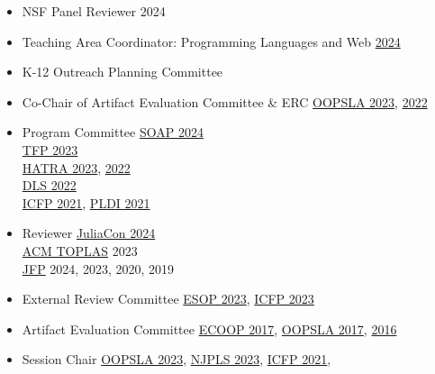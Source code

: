 \documentclass[11pt]{article}
\begin{document}
\begin{itemize}
  \item {NSF Panel Reviewer} \hfill {2024}
  \item {Teaching Area Coordinator: Programming Languages and Web} \hfill \href{https://users.cs.utah.edu/~regehr/teaching_areas/}{2024}
  \item {K-12 Outreach Planning Committee} \hfill {}
  \item {Co-Chair of Artifact Evaluation Committee \& ERC} \hfill \href{https://2023.splashcon.org}{OOPSLA 2023}, \href{https://2022.splashcon.org}{2022}
  \item {Program Committee} \hfill \href{https://pldi24.sigplan.org/home/SOAP-2024}{SOAP 2024} \\
   \hbox{} \hfill \href{https://trendsfp.github.io/}{TFP 2023} \\
   \hbox{}\hfill \href{https://2023.splashcon.org/home/hatra-2023}{HATRA 2023}, \href{https://2022.splashcon.org/home/hatra-2022}{2022} \\
   \hbox{}\hfill \href{https://2022.splashcon.org/track/dls-2022-papers}{DLS 2022} \\
   \hbox{}\hfill \href{https://icfp21.sigplan.org/committee/icfp-2021-papers-program-committee}{ICFP 2021}, \href{https://pldi21.sigplan.org/committee/pldi-2021-papers-program-committee}{PLDI 2021}
  \item {Reviewer} \hfill
    \href{https://juliacon.org/2024/}{JuliaCon 2024} \\
    \hbox{}\hfill \href{https://dl.acm.org/journal/toplas}{ACM TOPLAS} 2023 \\
    \hbox{}\hfill \href{https://www.cambridge.org/core/journals/journal-of-functional-programming}{JFP} 2024, 2023, 2020, 2019
  \item {External Review Committee} \hfill \href{https://etaps.org/2023/esop}{ESOP 2023},
                                           \href{https://icfp23.sigplan.org/}{ICFP 2023}
  \item {Artifact Evaluation Committee} \hfill \href{https://2017.ecoop.org/track/ecoop-2017-Artifacts}{ECOOP 2017},
                                               \href{https://2017.splashcon.org/track/splash-2017-OOPSLA-Artifacts}{OOPSLA 2017},
                                               \href{http://2016.splashcon.org/track/splash-2016-artifacts}{2016}
  \item {Session Chair} \hfill \href{https://2023.splashcon.org/program/program-splash-2023/?date=Wed%2025%20Oct%202023&room=Room%20II}{OOPSLA 2023},
                               \href{https://www.njpls.org/nov2023.html}{NJPLS 2023},
                               \href{https://icfp21.sigplan.org/program/program-icfp-2021/}{ICFP 2021},
\end{itemize}
\end{document}
